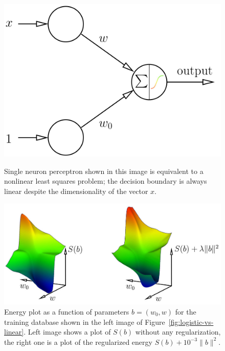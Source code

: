 \documentclass[notitlepage,oneside]{book}
\begin{document}
\begin{figure}[!b]
\begin{minipage}{.37\linewidth}
    \includegraphics[width=\linewidth]{neuron.png}
    \caption{Single neuron perceptron shown in this image is equivalent to a nonlinear least squares problem; the decision boundary is always linear despite the dimensionality of the vector $x$.}
    \label{fig:neuron1}
\end{minipage}
\hspace{0.02\linewidth}
\begin{minipage}{.6\linewidth}
\vspace{-6mm}\includegraphics[width=\linewidth]{ls-vs-crossentropy-energies1.jpg}
    \caption{
    Energy plot as a function of parameters $b= (w_0,w)$ for the training database shown in the left image of Figure~\ref{fig:logistic-vs-linear}.
 Left image shows a plot of $S(b)$ without any regularization, the right one is a plot of the regularized energy $S(b)+ 10^{-3} \|b\|^2$.
    }
    \label{fig:energies}
\end{minipage}
\end{figure}
\end{document}
